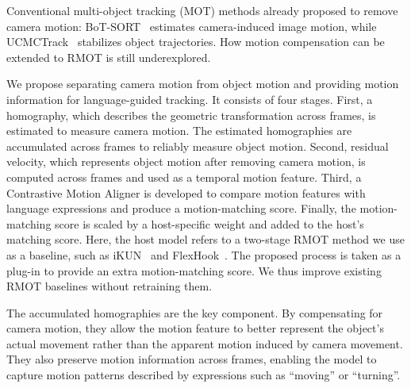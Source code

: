 \documentclass{article}
\begin{document}
Conventional multi-object tracking (MOT) methods already proposed to remove camera motion: BoT-SORT~\cite{botsort} estimates camera-induced image motion, while UCMCTrack~\cite{ucmctrack} stabilizes object trajectories. How motion compensation can be extended to RMOT is still underexplored.


We propose separating camera motion from object motion and providing motion information for language-guided tracking. It consists of four stages. First, a homography, which describes the geometric transformation across frames, is estimated to measure camera motion. The estimated homographies are accumulated across frames to reliably measure object motion. Second, residual velocity, which represents object motion after removing camera motion, is computed across frames and used as a temporal motion feature. Third, a Contrastive Motion Aligner is developed to compare motion features with language expressions and produce a motion-matching score. Finally, the motion-matching score is scaled by a host-specific weight and added to the host's matching score. Here, the host model refers to a two-stage RMOT method we use as a baseline, such as iKUN~\cite{ikun} and FlexHook~\cite{flexhook}. The proposed process is taken as a plug-in to provide an extra motion-matching score. We thus improve existing RMOT baselines without retraining them.

The accumulated homographies are the key component. By compensating for camera motion, they allow the motion feature to better represent the object's actual movement rather than the apparent motion induced by camera movement. They also preserve motion information across frames, enabling the model to capture motion patterns described by expressions such as \enquote{moving} or \enquote{turning}.
\end{document}
